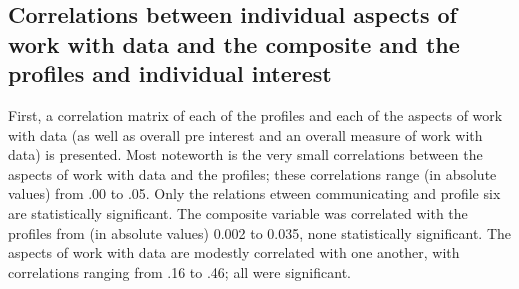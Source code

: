 \documentclass[]{book}
\theoremstyle{definition}
\theoremstyle{definition}
\theoremstyle{definition}
\theoremstyle{remark}
\begin{document}
\subsection{Correlations between individual aspects of work with data
and the composite and the profiles and individual
interest}\label{correlations-between-individual-aspects-of-work-with-data-and-the-composite-and-the-profiles-and-individual-interest}

First, a correlation matrix of each of the profiles and each of the
aspects of work with data (as well as overall pre interest and an
overall measure of work with data) is presented. Most noteworth is the
very small correlations between the aspects of work with data and the
profiles; these correlations range (in absolute values) from .00 to .05.
Only the relations etween communicating and profile six are
statistically significant. The composite variable was correlated with
the profiles from (in absolute values) 0.002 to 0.035, none
statistically significant. The aspects of work with data are modestly
correlated with one another, with correlations ranging from .16 to .46;
all were significant.

\begin{landscape}\begin{table}[H]
\centering
{}
\end{table}
\end{landscape}
\end{document}
